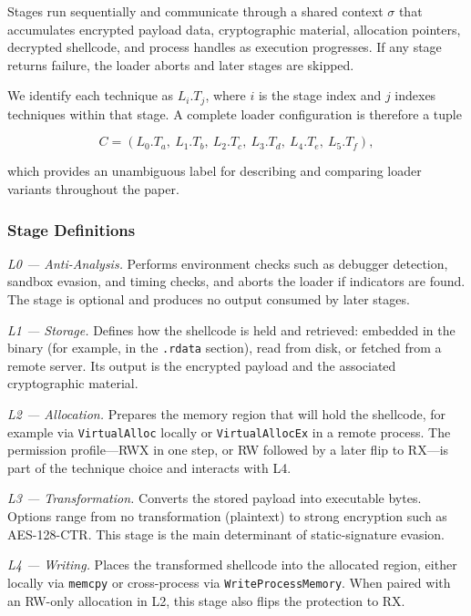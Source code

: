 Stages run sequentially and communicate through a shared context $\sigma$ that accumulates encrypted payload data, cryptographic material, allocation pointers, decrypted shellcode, and process handles as execution progresses.
If any stage returns failure, the loader aborts and later stages are skipped.

We identify each technique as $L_i.T_j$, where $i$ is the stage index and $j$ indexes techniques within that stage.
A complete loader configuration is therefore a tuple

\begin{equation}
    C = (L_0.T_a,\ L_1.T_b,\ L_2.T_c,\ L_3.T_d,\ L_4.T_e,\ L_5.T_f),
    \label{eq:config}
\end{equation}

\noindent which provides an unambiguous label for describing and comparing loader variants throughout the paper.

\subsubsection{Stage Definitions}

\textit{L0 --- Anti-Analysis.}
Performs environment checks such as debugger detection, sandbox evasion, and timing checks, and aborts the loader if indicators are found.
The stage is optional and produces no output consumed by later stages.

\textit{L1 --- Storage.}
Defines how the shellcode is held and retrieved: embedded in the binary (for example, in the \texttt{.rdata} section), read from disk, or fetched from a remote server.
Its output is the encrypted payload and the associated cryptographic material.

\textit{L2 --- Allocation.}
Prepares the memory region that will hold the shellcode, for example via \texttt{VirtualAlloc} locally or \texttt{VirtualAllocEx} in a remote process.
The permission profile---RWX in one step, or RW followed by a later flip to RX---is part of the technique choice and interacts with L4.

\textit{L3 --- Transformation.}
Converts the stored payload into executable bytes.
Options range from no transformation (plaintext) to strong encryption such as AES-128-CTR.
This stage is the main determinant of static-signature evasion.

\textit{L4 --- Writing.}
Places the transformed shellcode into the allocated region, either locally via \texttt{memcpy} or cross-process via \texttt{WriteProcessMemory}.
When paired with an RW-only allocation in L2, this stage also flips the protection to RX.

